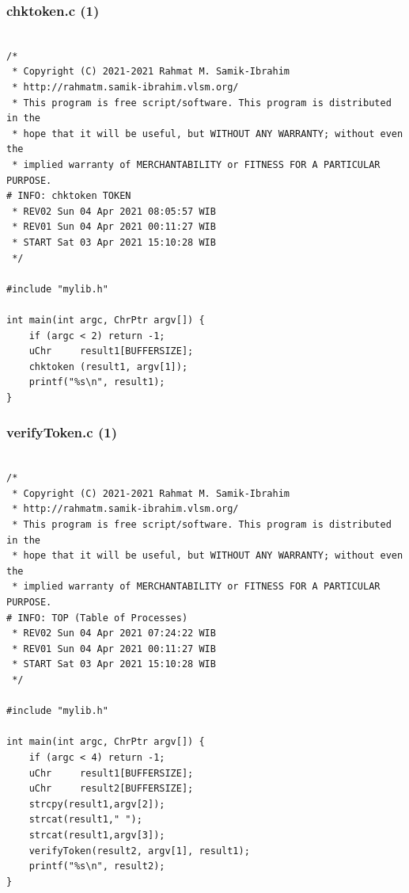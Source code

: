 \documentclass[xcolor=table, notheorems, hyperref={pdfpagelabels=false}]{beamer}
\begin{document}
\begin{frame}[fragile]
\frametitle{chktoken.c (1)}
\begin{lstlisting}[basicstyle=\ttfamily\tiny]         % 108

/*
 * Copyright (C) 2021-2021 Rahmat M. Samik-Ibrahim
 * http://rahmatm.samik-ibrahim.vlsm.org/
 * This program is free script/software. This program is distributed in the 
 * hope that it will be useful, but WITHOUT ANY WARRANTY; without even the 
 * implied warranty of MERCHANTABILITY or FITNESS FOR A PARTICULAR PURPOSE.
# INFO: chktoken TOKEN
 * REV02 Sun 04 Apr 2021 08:05:57 WIB
 * REV01 Sun 04 Apr 2021 00:11:27 WIB
 * START Sat 03 Apr 2021 15:10:28 WIB
 */

#include "mylib.h"

int main(int argc, ChrPtr argv[]) {
    if (argc < 2) return -1;
    uChr     result1[BUFFERSIZE];
    chktoken (result1, argv[1]);
    printf("%s\n", result1);
}

\end{lstlisting}
\end{frame}

\begin{frame}[fragile]
\frametitle{verifyToken.c (1)}
\begin{lstlisting}[basicstyle=\ttfamily\tiny]         % 108

/*
 * Copyright (C) 2021-2021 Rahmat M. Samik-Ibrahim
 * http://rahmatm.samik-ibrahim.vlsm.org/
 * This program is free script/software. This program is distributed in the 
 * hope that it will be useful, but WITHOUT ANY WARRANTY; without even the 
 * implied warranty of MERCHANTABILITY or FITNESS FOR A PARTICULAR PURPOSE.
# INFO: TOP (Table of Processes)
 * REV02 Sun 04 Apr 2021 07:24:22 WIB
 * REV01 Sun 04 Apr 2021 00:11:27 WIB
 * START Sat 03 Apr 2021 15:10:28 WIB
 */

#include "mylib.h"

int main(int argc, ChrPtr argv[]) {
    if (argc < 4) return -1;
    uChr     result1[BUFFERSIZE];
    uChr     result2[BUFFERSIZE];
    strcpy(result1,argv[2]);
    strcat(result1," ");
    strcat(result1,argv[3]);
    verifyToken(result2, argv[1], result1);
    printf("%s\n", result2);
}

\end{lstlisting}
\end{frame}
\end{document}
